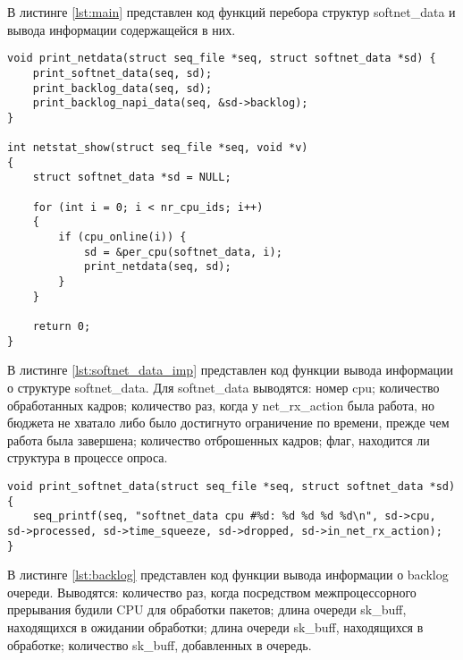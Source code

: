 В листинге \ref{lst:main} представлен код функций перебора структур softnet\_data и вывода информации содержащейся в них.

\begin{center}
	\captionsetup{justification=raggedright,singlelinecheck=off}
	\begin{lstlisting}[label=lst:main,caption=Функции перебора и вывода информации о структуре softnet\_data ,showstringspaces=false]
void print_netdata(struct seq_file *seq, struct softnet_data *sd) {
	print_softnet_data(seq, sd);
	print_backlog_data(seq, sd);
	print_backlog_napi_data(seq, &sd->backlog);
}

int netstat_show(struct seq_file *seq, void *v)
{
	struct softnet_data *sd = NULL;
	
	for (int i = 0; i < nr_cpu_ids; i++)
	{
		if (cpu_online(i)) {
			sd = &per_cpu(softnet_data, i);
			print_netdata(seq, sd);
		}
	}
	
	return 0;
}
	\end{lstlisting}
\end{center}
\FloatBarrier

В листинге \ref{lst:softnet_data_imp} представлен код функции вывода информации о структуре softnet\_data. Для softnet\_data выводятся: номер cpu; количество обработанных кадров; количество раз, когда у net\_rx\_action была работа, но бюджета не хватало либо было достигнуто ограничение по времени, прежде чем работа была завершена; количество отброшенных кадров; флаг, находится ли структура в процессе опроса.

\begin{center}
	\captionsetup{justification=raggedright,singlelinecheck=off}
	\begin{lstlisting}[label=lst:softnet_data_imp,caption=Функция вывода информации о структуре softnet\_data,showstringspaces=false]
void print_softnet_data(struct seq_file *seq, struct softnet_data *sd){
	seq_printf(seq, "softnet_data cpu #%d: %d %d %d %d\n", sd->cpu, sd->processed, sd->time_squeeze, sd->dropped, sd->in_net_rx_action);
}
	\end{lstlisting}
\end{center}
\FloatBarrier

В листинге \ref{lst:backlog} представлен код функции вывода информации о backlog очереди. Выводятся: количество раз, когда посредством межпроцессорного прерывания будили CPU для обработки пакетов; длина очереди sk\_buff, находящихся в ожидании обработки; длина очереди sk\_buff, находящихся в обработке; количество sk\_buff, добавленных в очередь.

